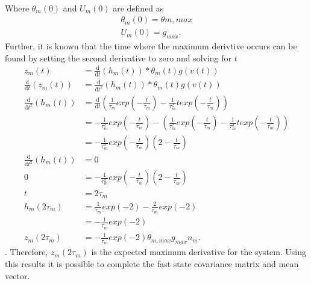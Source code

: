 \begin{align}
 \end{align} Where $\theta_{m}(0)$ and $U_{m}(0)$ are defined as \begin{align}
\theta_{m}(0)= \theta{m,max}\\
U_{m}(0) = g_{max}. \end{align} Further, it is known that the time where the maximum derivtive occurs can be found by setting the second derivative to zero and solving for $t$ \begin{align}
z_{m}(t) &= \frac{\mathrm{d}}{\mathrm{d}t}\left(h_{m}(t)\right)*\theta_{m}(t)g(v(t))\\
\frac{\mathrm{d}}{\mathrm{d}t}(z_{m}(t)) & = \frac{\mathrm{d}}{\mathrm{d}t^2}\left(h_{m}(t)\right)*\theta_{m}(t)g(v(t))\\
\frac{\mathrm{d}}{\mathrm{d}t^2}\left(h_{m}(t)\right) &= \frac{\mathrm{d}}{\mathrm{d}t}\left(\frac{1}{\tau_{m}}exp\left(-\frac{t}{\tau_{m}}\right) - \frac{1}{\tau^2_{m}}texp\left(-\frac{t}{\tau_{m}}\right)\right)\\
&= -\frac{1}{\tau^2_{m}}exp\left(-\frac{t}{\tau_{m}}\right)-\left(\frac{1}{\tau^2_{m}}exp\left(-\frac{t}{\tau_{m}}\right) - \frac{1}{\tau^3_{m}}texp\left(-\frac{t}{\tau_{m}}\right)\right)\\
&=  -\frac{1}{\tau^2_{m}}exp\left(-\frac{t}{\tau_{m}}\right)\left(2-\frac{t}{\tau_{m}}\right)\\
\frac{\mathrm{d}}{\mathrm{d}t^2}\left(h_{m}(t)\right) &=0\\
0 &= -\frac{1}{\tau^2_{m}}exp\left(-\frac{t}{\tau_{m}}\right)\left(2-\frac{t}{\tau_{m}}\right)\\
t &= 2\tau_{m}\\
h_{m}(2\tau_{m}) &= \frac{1}{\tau_{m}}exp(-2) - \frac{2}{\tau_{m}}exp(-2)\\
&= -\frac{1}{\tau_{m}}exp(-2)\\
z_{m}(2\tau_{m}) &= -\frac{1}{\tau_{m}}exp(-2)\theta_{m,max}g_{max}n_{m}.
\end{align}. Therefore, $z_{m}(2\tau_{m})$ is the expected maximum derivative for the system. Using this results it is possible to complete the fast state covariance matrix and mean vector. 
